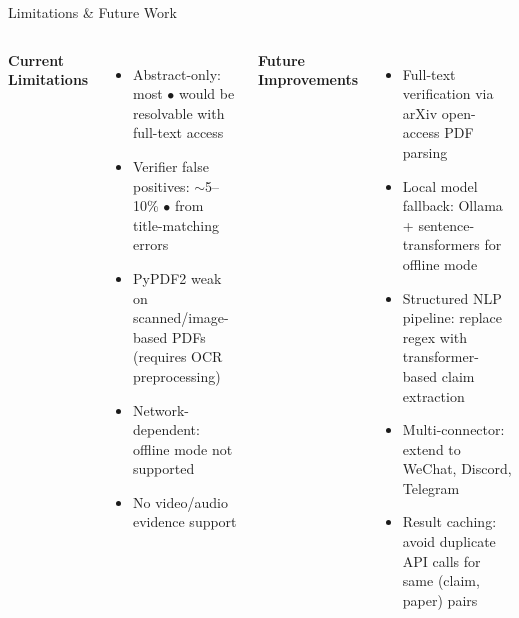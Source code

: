 \documentclass[aspectratio=169,11pt]{beamer}
\begin{document}
\begin{frame}{Limitations \& Future Work}
  \begin{columns}[T]
    \textbf{Current Limitations}
    \begin{itemize}
      \footnotesize
      \item Abstract-only: most \textcolor{yellowRYG}{$\bullet$} would be resolvable with full-text access
      \item Verifier false positives: $\sim$5--10\% \textcolor{redRYG}{$\bullet$} from title-matching errors
      \item PyPDF2 weak on scanned/image-based PDFs (requires OCR preprocessing)
      \item Network-dependent: offline mode not supported
      \item No video/audio evidence support
    \end{itemize}

    \textbf{Future Improvements}
    \begin{itemize}
      \footnotesize
      \item Full-text verification via arXiv open-access PDF parsing
      \item Local model fallback: Ollama + sentence-transformers for offline mode
      \item Structured NLP pipeline: replace regex with transformer-based claim extraction
      \item Multi-connector: extend to WeChat, Discord, Telegram
      \item Result caching: avoid duplicate API calls for same (claim, paper) pairs
    \end{itemize}
  \end{columns}
\end{frame}
\end{document}
